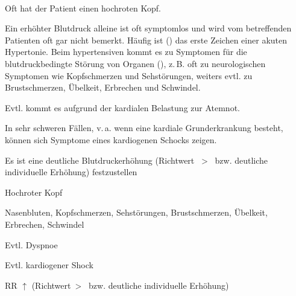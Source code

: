 {\TxABCDE}
{~
\begin{ABCDEText}
  \item[\ABCDE{2}] Oft hat der Patient einen
  hochroten Kopf.
  \item[\ABCDE{4}] Ein erhöhter Blutdruck alleine ist oft symptomlos und wird
vom betreffenden Patienten oft gar nicht bemerkt. Häufig ist
 () das
  erste Zeichen einer akuten Hypertonie. Beim
  hypertensiven  kommt es zu Symptomen für die
  blutdruckbedingte Störung von Organen
  (), z.\,B. oft zu neurologischen
  Symptomen wie Kopfschmerzen und Sehstörungen, weiters
  evtl. zu Brustschmerzen, Übelkeit,
  Erbrechen und Schwindel.
  \item[\ABCDE{B}] Evtl. kommt es aufgrund der kardialen Belastung zur Atemnot.
  \item[\ABCDE{C}] In sehr schweren Fällen, v.\,a. wenn eine
  kardiale Grunderkrankung besteht, können sich Symptome
  eines kardiogenen Schocks zeigen.
  \item[\ABCDE{D}] Es ist eine deutliche Blutdruckerhöhung
  (Richtwert ~{\textgreater}~
  bzw. deutliche individuelle Erhöhung) festzustellen
\end{ABCDEText}
}
{
\begin{ABCDESlide}
  \item[\ABCDE{2}] Hochroter Kopf 
  \item[\ABCDE{4}] Nasenbluten, Kopfschmerzen, Sehstörungen, Brustschmerzen, Übelkeit, Erbrechen, Schwindel
  \item[\ABCDE{B}] Evtl. Dyspnoe
  \item[\ABCDE{C}] Evtl. kardiogener Shock
  \item[\ABCDE{D}] RR $\uparrow$ (Richtwert~{\textgreater}~ 
  bzw. deutliche individuelle Erhöhung)
\end{ABCDESlide}
}
{}
{}
{}

